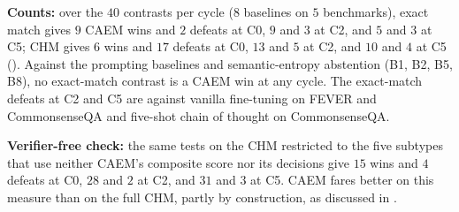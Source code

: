 \textbf{Counts:} over the $40$ contrasts per cycle ($8$ baselines on $5$ benchmarks), exact match gives $9$ CAEM wins and $2$ defeats at C0, $9$ and $3$ at C2, and $5$ and $3$ at C5; CHM gives $6$ wins and $17$ defeats at C0, $13$ and $5$ at C2, and $10$ and $4$ at C5 (). Against the prompting baselines and semantic-entropy abstention (B1, B2, B5, B8), no exact-match contrast is a CAEM win at any cycle. The exact-match defeats at C2 and C5 are against vanilla fine-tuning on FEVER and CommonsenseQA and five-shot chain of thought on CommonsenseQA.

\textbf{Verifier-free check:} the same tests on the CHM restricted to the five subtypes that use neither CAEM's composite score nor its decisions give $15$ wins and $4$ defeats at C0, $28$ and $2$ at C2, and $31$ and $3$ at C5. CAEM fares better on this measure than on the full CHM, partly by construction, as discussed in .
